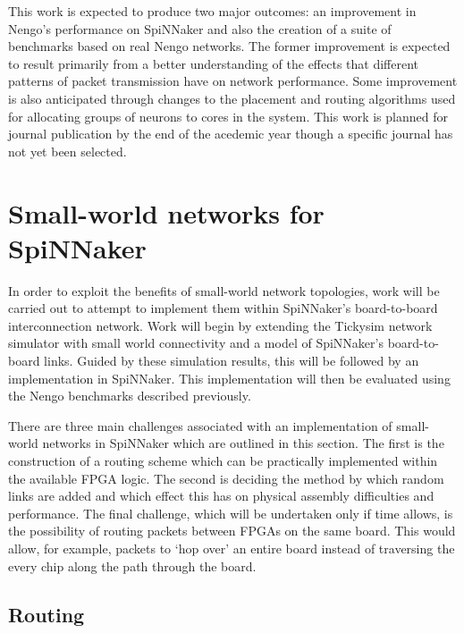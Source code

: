 		This work is expected to produce two major outcomes: an improvement in
		Nengo's performance on SpiNNaker and also the creation of a suite of
		benchmarks based on real Nengo networks. The former improvement is expected
		to result primarily from a better understanding of the effects that
		different patterns of packet transmission have on network performance. Some
		improvement is also anticipated through changes to the placement and routing
		algorithms used for allocating groups of neurons to cores in the system.
		This work is planned for journal publication by the end of the acedemic year
		though a specific journal has not yet been selected.
		
	
	\section{Small-world networks for SpiNNaker}
		
		
		In order to exploit the benefits of small-world network topologies, work
		will be carried out to attempt to implement them within SpiNNaker's
		board-to-board interconnection network. Work will begin by extending the
		Tickysim network simulator with small world connectivity and a model of
		SpiNNaker's board-to-board links. Guided by these simulation results, this
		will be followed by an implementation in SpiNNaker.  This implementation
		will then be evaluated using the Nengo benchmarks described previously.
		
		There are three main challenges associated with an implementation of
		small-world networks in SpiNNaker which are outlined in this section. The
		first is the construction of a routing scheme which can be practically
		implemented within the available FPGA logic. The second is deciding the
		method by which random links are added and which effect this has on physical
		assembly difficulties and performance. The final challenge, which will be
		undertaken only if time allows, is the possibility of routing packets
		between FPGAs on the same board. This would allow, for example, packets to
		`hop over' an entire board instead of traversing the every chip along the
		path through the board.
		
		\subsection{Routing}
			
